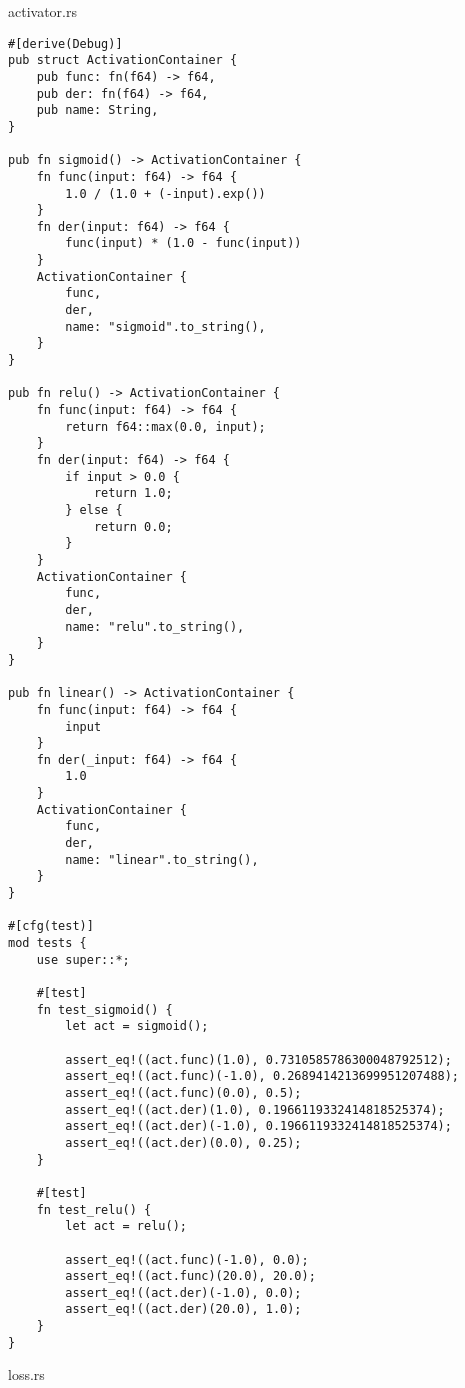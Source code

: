 \noindent activator.rs
\begin{verbatim}
#[derive(Debug)]
pub struct ActivationContainer {
    pub func: fn(f64) -> f64,
    pub der: fn(f64) -> f64,
    pub name: String,
}

pub fn sigmoid() -> ActivationContainer {
    fn func(input: f64) -> f64 {
        1.0 / (1.0 + (-input).exp())
    }
    fn der(input: f64) -> f64 {
        func(input) * (1.0 - func(input))
    }
    ActivationContainer {
        func,
        der,
        name: "sigmoid".to_string(),
    }
}

pub fn relu() -> ActivationContainer {
    fn func(input: f64) -> f64 {
        return f64::max(0.0, input);
    }
    fn der(input: f64) -> f64 {
        if input > 0.0 {
            return 1.0;
        } else {
            return 0.0;
        }
    }
    ActivationContainer {
        func,
        der,
        name: "relu".to_string(),
    }
}

pub fn linear() -> ActivationContainer {
    fn func(input: f64) -> f64 {
        input
    }
    fn der(_input: f64) -> f64 {
        1.0
    }
    ActivationContainer {
        func,
        der,
        name: "linear".to_string(),
    }
}

#[cfg(test)]
mod tests {
    use super::*;

    #[test]
    fn test_sigmoid() {
        let act = sigmoid();

        assert_eq!((act.func)(1.0), 0.7310585786300048792512);
        assert_eq!((act.func)(-1.0), 0.2689414213699951207488);
        assert_eq!((act.func)(0.0), 0.5);
        assert_eq!((act.der)(1.0), 0.1966119332414818525374);
        assert_eq!((act.der)(-1.0), 0.1966119332414818525374);
        assert_eq!((act.der)(0.0), 0.25);
    }

    #[test]
    fn test_relu() {
        let act = relu();

        assert_eq!((act.func)(-1.0), 0.0);
        assert_eq!((act.func)(20.0), 20.0);
        assert_eq!((act.der)(-1.0), 0.0);
        assert_eq!((act.der)(20.0), 1.0);
    }
}

\end{verbatim}
\noindent loss.rs
